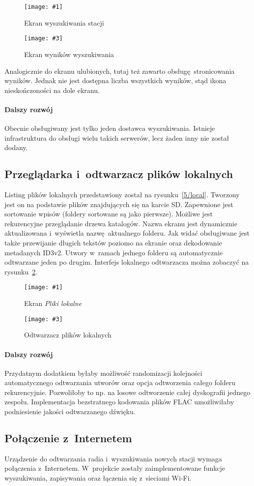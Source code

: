 \documentclass[polish]{aghengthesis}
\newcommand{\imgintss}[5]{
	\begin{figure}[{#5}]
		\centering
		\begin{minipage}{.45\textwidth}
			\centering
			\texttt{[image: \#1]}
			\caption{#2}
			\label{#1}
		\end{minipage}%
		\hfill
		\begin{minipage}{.45\textwidth}
			\centering
			\texttt{[image: \#3]}
			\caption{#4}
			\label{#3}
		\end{minipage}
	\end{figure}
}
\newcommand{\imghss}[4]{\imgintss{#1}{#2}{#3}{#4}{H}}
\begin{document}
			\imghss{5/search}{Ekran wyszukiwania stacji}{5/searchres}{Ekran wyników wyszukiwania}
			
			Analogicznie do ekranu ulubionych, tutaj też zawarto obsługę stronicowania wyników. Jednak nie jest dostępna liczba wszystkich wyników, stąd ikona nieskończoności na dole ekranu.
			
			\paragraph{Dalszy rozwój}
				Obecnie obsługiwany jest tylko jeden dostawca wyszukiwania. Istnieje infrastruktura do obsługi wielu takich serwerów, lecz żaden inny nie został dodany.
			
		\subsection{Przeglądarka i~odtwarzacz plików lokalnych}
			Listing plików lokalnych przedstawiony został na rysunku~\ref{5/local}. Tworzony jest on na podstawie plików znajdujących się na karcie SD. Zapewnione jest sortowanie wpisów (foldery sortowane są jako pierwsze). Możliwe jest rekurencyjne przeglądanie drzewa katalogów. Nazwa ekranu jest dynamicznie aktualizowana i~wyświetla nazwę aktualnego folderu. Jak widać obsługiwane jest także przewijanie długich tekstów poziomo na ekranie oraz dekodowanie metadanych ID3v2. Utwory w~ramach jednego folderu są automatycznie odtwarzane jeden po drugim. Interfejs lokalnego odtwarzacza można zobaczyć na rysunku~\ref{5/local_play}.
			
			\imghss{5/local}{Ekran \textit{Pliki lokalne}}{5/local_play}{Odtwarzacz plików lokalnych}
			
			\paragraph{Dalszy rozwój}
				Przydatnym dodatkiem byłaby możliwość randomizacji kolejności automatycznego odtwarzania utworów oraz opcja odtworzenia całego folderu rekurencyjnie. Pozwoliłoby to np. na losowe odtworzenie całej dyskografii jednego zespołu. Implementacja bezstratnego kodowania plików FLAC umożliwiłaby podniesienie jakości odtwarzanego dźwięku.
		
		\subsection{Połączenie z~Internetem}
			Urządzenie do odtwarzania radia i~wyszukiwania nowych stacji wymaga połączenia z~Internetem. W~projekcie zostały zaimplementowane funkcje wyszukiwania, zapisywania oraz łączenia się z~sieciami Wi-Fi.
			$ $\\
			
\end{document}
